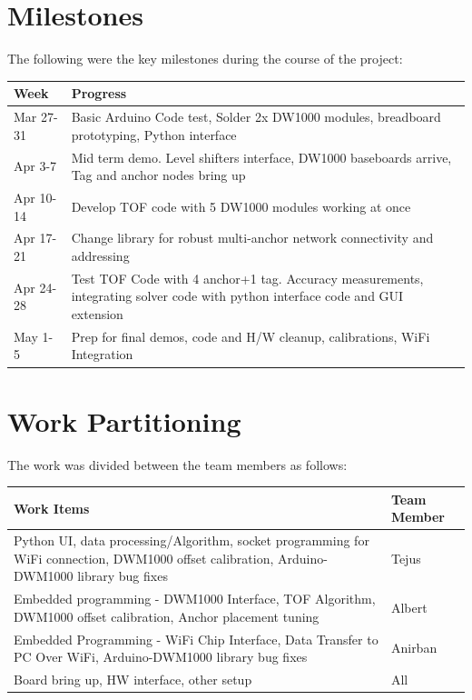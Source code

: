 \documentclass[journal,transmag]{IEEEtran}
\begin{document}
\section{Milestones}
The following were the key milestones during the course of the project:
\begin{center}
\begin{tabular}{ |m{1.5cm}|m{6.0cm}|}
\hline
\textbf{Week} & \textbf{Progress} \\ 
\hline
Mar 27-31 & Basic Arduino Code test, Solder 2x DW1000
modules, breadboard prototyping, Python interface\\
\hline
Apr 3-7 &Mid term demo. Level shifters interface, DW1000
baseboards arrive, Tag and anchor nodes bring up\\
\hline
Apr 10-14 & Develop TOF code with 5 DW1000 modules
working at once\\
\hline
Apr 17-21 & Change library for robust multi-anchor network
connectivity and addressing\\
\hline
Apr 24-28 & Test TOF Code with 4 anchor+1 tag. Accuracy
measurements,
integrating solver code with python interface code
and GUI extension\\
\hline
May 1-5 & Prep for final demos, code and H/W cleanup,
calibrations, WiFi Integration\\
\hline
\end{tabular}
\end{center}



\section{Work Partitioning}
The work was divided between the team members as follows:

\begin{center}
\begin{tabular}{ |m{6cm}|m{1.25cm}|}
\hline
Work Items &	Team Member\\
\hline
Python UI, data processing/Algorithm, socket programming for WiFi connection, DWM1000 offset calibration, Arduino-DWM1000 library bug fixes&	Tejus\\
\hline
Embedded programming - DWM1000 Interface, TOF Algorithm, DWM1000 offset calibration, Anchor placement tuning &	Albert\\
\hline
Embedded Programming - WiFi Chip Interface, Data Transfer to PC Over WiFi, Arduino-DWM1000 library bug fixes & Anirban\\
\hline
Board bring up, HW interface, other setup & All\\
\hline
\end{tabular}
\end{center}
\end{document}
